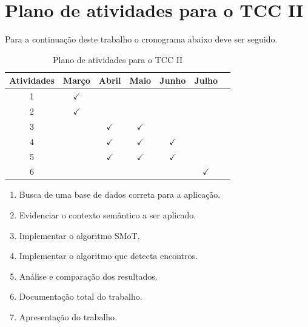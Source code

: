\documentclass[	12pt, Times, openright, twoside, a4paper, english, brazil]{abntex2}
\begin{document}
  \chapter{Plano de atividades para o TCC II}
    Para a continuação deste trabalho o cronograma abaixo deve ser seguido.

    \begin{table}[!ht]
    	\centering
    		\caption{Plano de atividades para o TCC II}	\label{tab:plano}
    		\begin{tabular}{|c|c|c|c|c|c|c|}
    			\hline  \textbf{Atividades} &	\textbf{Março} &	\textbf{Abril} & \textbf{Maio} & \textbf{Junho} & \textbf{Julho} \\
    			\hline 1 & $\checkmark$ 	& & & & 	\\
    			\hline 2 & $\checkmark$	& & & & 	\\
    			\hline 3 & 	&$\checkmark$ &$\checkmark$ & & 	\\
    			\hline 4 & 	&$\checkmark$ &$\checkmark$ &$\checkmark$ & 	\\
    			\hline 5 & 	&$\checkmark$ &$\checkmark$ &$\checkmark$ & 	\\
                \hline 6 &  & & & &$\checkmark$ 	\\
    			\hline 
    		\end{tabular}
    \end{table}
    \begin{enumerate}
    \item Busca de uma base de dados correta para a aplicação.
    \item Evidenciar o contexto semântico a ser aplicado.
    \item Implementar o algoritmo SMoT.
    \item Implementar o algoritmo que detecta encontros.
    \item Análise e comparação dos resultados.
    \item Documentação total do trabalho.
    \item Apresentação do trabalho.
    \end{enumerate}

\end{document}
